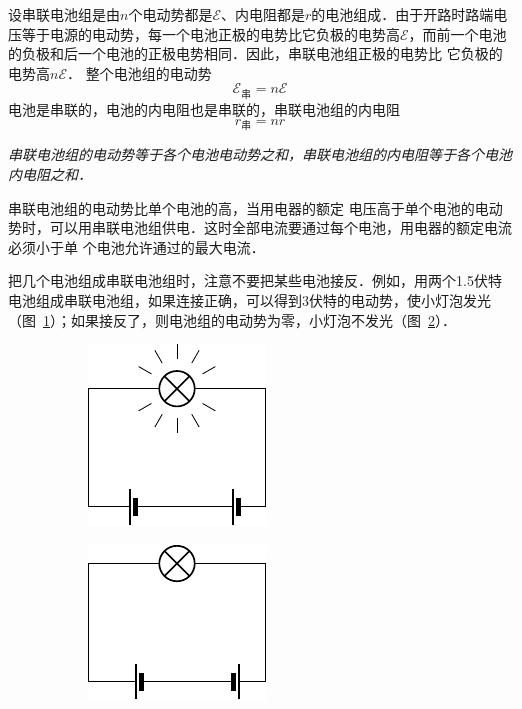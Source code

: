设串联电池组是由$n$个电动势都是$\mathcal{E}$、内电阻都是$r$的电池组成．由于开路时路端电压等于电源的电动势，每一个电池正极的电势比它负极的电势高$\mathcal{E}$，而前一个电池的负极和后一个电池的正极电势相同．因此，串联电池组正极的电势比
它负极的电势高$n\mathcal{E}$．
整个电池组的电动势
\[\mathcal{E}_{\text{串}}=n\mathcal{E}\]
电池是串联的，电池的内电阻也是串联的，串联电池组的内电阻
\[r_{\text{串}}=nr\]

\textit{串联电池组的电动势等于各个电池电动势之和，串联电池组的内电阻等于各个电池内电阻之和．}

串联电池组的电动势比单个电池的高，当用电器的额定
电压高于单个电池的电动势时，可以用串联电池组供电．这时全部电流要通过每个电池，用电器的额定电流必须小于单
个电池允许通过的最大电流．

把几个电池组成串联电池组时，注意不要把某些电池接反．例如，用两个1.5伏特电池组成串联电池组，如果连接正确，可以得到3伏特的电动势，使小灯泡发光（图~\ref{fig_B_7-34a}）；如果接反了，则电池组的电动势为零，小灯泡不发光（图~\ref{fig_B_7-34b}）．
\begin{figure}[htbp]
    \centering
    \begin{subfigure}{0.4\linewidth}
        \centering
        \includegraphics{fig/B/7-34a.pdf}
        \caption{}\label{fig_B_7-34a}
    \end{subfigure}
    \hfil
    \begin{subfigure}{0.4\linewidth}
        \centering
        \includegraphics{fig/B/7-34b.pdf}
        \caption{}\label{fig_B_7-34b}
    \end{subfigure}
    \caption{}\label{fig_B_7-34}
\end{figure}



